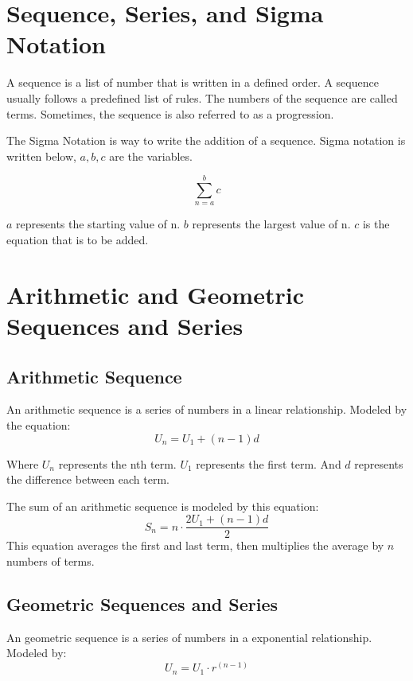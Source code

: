 \documentclass[../notes.tex]{subfiles}
\begin{document}
\section{Sequence, Series, and Sigma Notation}
A sequence is a list of number that is written in a defined order.
A sequence usually follows a predefined list of rules.
The numbers of the sequence are called terms.
Sometimes, the sequence is also referred to as a progression.

The Sigma Notation is way to write the addition of a sequence.
Sigma notation is written below, $a,b,c$ are the variables.

\begin{equation}
	\sum_{n=a}^{b} c
\end{equation}

$a$ represents the starting value of n.
$b$ represents the largest value of n.
$c$ is the equation that is to be added.

\section{Arithmetic and Geometric Sequences and Series}
\subsection{Arithmetic Sequence}
An arithmetic sequence is a series of numbers in a linear relationship.
Modeled by the equation:
\begin{equation}
	U_n = U_1 + (n-1)d
\end{equation}

Where $U_n$ represents the nth term.
$U_1$ represents the first term.
And $d$ represents the difference between each term.

The sum of an arithmetic sequence is modeled by this equation:
\begin{equation}
	S_n = n\cdot\frac{2U_1+(n-1)d}{2}
\end{equation}
This equation averages the first and last term, then multiplies the average by $n$ numbers of terms.

\subsection{Geometric Sequences and Series}
An geometric sequence is a series of numbers in a exponential relationship.
Modeled by:
\begin{equation}
	U_n = U_1 \cdot r^(n-1)
\end{equation}
\end{document}
